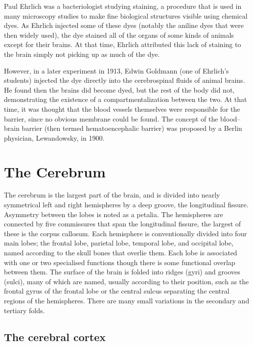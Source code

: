 \documentclass[]{book}
\begin{document}
Paul Ehrlich was a bacteriologist studying staining, a procedure that is used in many microscopy studies to make fine biological structures visible using chemical dyes. As Ehrlich injected some of these dyes (notably the aniline dyes that were then widely used), the dye stained all of the organs of some kinds of animals except for their brains. At that time, Ehrlich attributed this lack of staining to the brain simply not picking up as much of the dye.

However, in a later experiment in 1913, Edwin Goldmann (one of Ehrlich's students) injected the dye directly into the cerebrospinal fluids of animal brains. He found then the brains did become dyed, but the rest of the body did not, demonstrating the existence of a compartmentalization between the two. At that time, it was thought that the blood vessels themselves were responsible for the barrier, since no obvious membrane could be found. The concept of the blood--brain barrier (then termed hematoencephalic barrier) was proposed by a Berlin physician, Lewandowsky, in 1900.

\hypertarget{the-cerebrum}{%
\section{The Cerebrum}\label{the-cerebrum}}

The cerebrum is the largest part of the brain, and is divided into nearly symmetrical left and right hemispheres by a deep groove, the longitudinal fissure. Asymmetry between the lobes is noted as a petalia. The hemispheres are connected by five commissures that span the longitudinal fissure, the largest of these is the corpus callosum. Each hemisphere is conventionally divided into four main lobes; the frontal lobe, parietal lobe, temporal lobe, and occipital lobe, named according to the skull bones that overlie them. Each lobe is associated with one or two specialised functions though there is some functional overlap between them. The surface of the brain is folded into ridges (gyri) and grooves (sulci), many of which are named, usually according to their position, such as the frontal gyrus of the frontal lobe or the central sulcus separating the central regions of the hemispheres. There are many small variations in the secondary and tertiary folds.

\hypertarget{the-cerebral-cortex}{%
\subsection{The cerebral cortex}\label{the-cerebral-cortex}}
\end{document}

